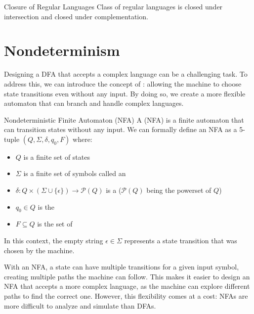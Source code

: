 \documentclass[math]{amznotes}
\begin{document}
\begin{thmbox}{Closure of Regular Languages}{}
    Class of regular languages is closed under intersection and closed under complementation.
\end{thmbox}

\section{Nondeterminism}

Designing a DFA that accepts a complex language can be a challenging task. To address this, we can introduce the concept of : allowing the machine to choose state transitions even without any input. By doing so, we create a more flexible automaton that can branch and handle complex languages.


\begin{dfnbox}{Nondeterministic Finite Automaton (NFA)}{}
    A  (NFA) is a finite automaton that can transition states without any input.
    \tcblower
    We can formally define an NFA as a 5-tuple $(Q, \Sigma, \delta, q_0, F)$ where:
    \begin{itemize}[noitemsep]
        \item $Q$ is a finite set of states
        \item $\Sigma$ is a finite set of symbols called an 
        \item $\delta : Q \times (\Sigma \cup \{ \epsilon\}) \to \mathcal{P}(Q)$ is a  ($\mathcal{P}(Q)$ being the powerset of $Q$)
        \item $q_0 \in Q$ is the 
        \item $F \subseteq Q$ is the set of 
    \end{itemize}
    In this context, the empty string $\epsilon \in \Sigma$ represents a state transition that was chosen by the machine.
\end{dfnbox}

With an NFA, a state can have multiple transitions for a given input symbol, creating multiple paths the machine can follow. This makes it easier to design an NFA that accepts a more complex language, as the machine can explore different paths to find the correct one. However, this flexibility comes at a cost: NFAs are more difficult to analyze and simulate than DFAs.
\end{document}

